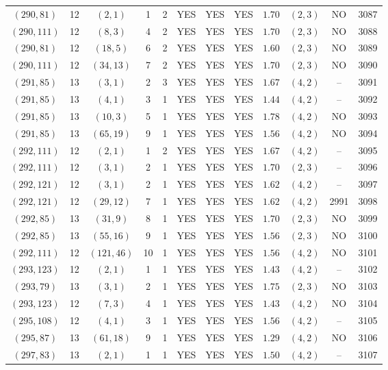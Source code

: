 \begin{longtable}{|c|c|c|c|c|c|c|c|c|c|c|c|}
$(290,81)$ & 12 & $(2,1)$ & 1 & 2 & YES & YES & YES & $1.70$ & $(2,3)$ & NO & 3087\\
$(290,111)$ & 12 & $(8,3)$ & 4 & 2 & YES & YES & YES & $1.70$ & $(2,3)$ & NO & 3088\\
$(290,81)$ & 12 & $(18,5)$ & 6 & 2 & YES & YES & YES & $1.60$ & $(2,3)$ & NO & 3089\\
$(290,111)$ & 12 & $(34,13)$ & 7 & 2 & YES & YES & YES & $1.70$ & $(2,3)$ & NO & 3090\\
$(291,85)$ & 13 & $(3,1)$ & 2 & 3 & YES & YES & YES & $1.67$ & $(4,2)$ & -- & 3091\\
$(291,85)$ & 13 & $(4,1)$ & 3 & 1 & YES & YES & YES & $1.44$ & $(4,2)$ & -- & 3092\\
$(291,85)$ & 13 & $(10,3)$ & 5 & 1 & YES & YES & YES & $1.78$ & $(4,2)$ & NO & 3093\\
$(291,85)$ & 13 & $(65,19)$ & 9 & 1 & YES & YES & YES & $1.56$ & $(4,2)$ & NO & 3094\\
$(292,111)$ & 12 & $(2,1)$ & 1 & 2 & YES & YES & YES & $1.67$ & $(4,2)$ & -- & 3095\\
$(292,111)$ & 12 & $(3,1)$ & 2 & 1 & YES & YES & YES & $1.70$ & $(2,3)$ & -- & 3096\\
$(292,121)$ & 12 & $(3,1)$ & 2 & 1 & YES & YES & YES & $1.62$ & $(4,2)$ & -- & 3097\\
$(292,121)$ & 12 & $(29,12)$ & 7 & 1 & YES & YES & YES & $1.62$ & $(4,2)$ & 2991 & 3098\\
$(292,85)$ & 13 & $(31,9)$ & 8 & 1 & YES & YES & YES & $1.70$ & $(2,3)$ & NO & 3099\\
$(292,85)$ & 13 & $(55,16)$ & 9 & 1 & YES & YES & YES & $1.56$ & $(2,3)$ & NO & 3100\\
$(292,111)$ & 12 & $(121,46)$ & 10 & 1 & YES & YES & YES & $1.56$ & $(4,2)$ & NO & 3101\\
$(293,123)$ & 12 & $(2,1)$ & 1 & 1 & YES & YES & YES & $1.43$ & $(4,2)$ & -- & 3102\\
$(293,79)$ & 13 & $(3,1)$ & 2 & 1 & YES & YES & YES & $1.75$ & $(2,3)$ & NO & 3103\\
$(293,123)$ & 12 & $(7,3)$ & 4 & 1 & YES & YES & YES & $1.43$ & $(4,2)$ & NO & 3104\\
$(295,108)$ & 12 & $(4,1)$ & 3 & 1 & YES & YES & YES & $1.56$ & $(4,2)$ & -- & 3105\\
$(295,87)$ & 13 & $(61,18)$ & 9 & 1 & YES & YES & YES & $1.29$ & $(4,2)$ & NO & 3106\\
$(297,83)$ & 13 & $(2,1)$ & 1 & 1 & YES & YES & YES & $1.50$ & $(4,2)$ & -- & 3107\\

\end{longtable}
